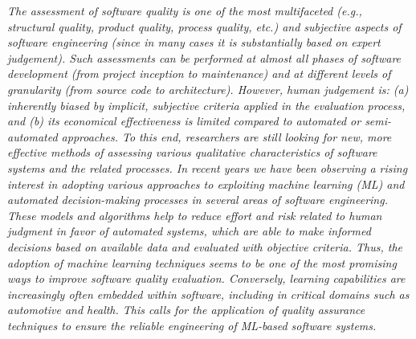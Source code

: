 \begin{myquote}{2em}
    \itshape
    The assessment of software quality is one of the most multifaceted (e.g., structural quality, product quality, process quality, etc.) and subjective aspects of software engineering (since in many cases it is substantially based on expert judgement).
    Such assessments can be performed at almost all phases of software development (from project inception to maintenance) and at different levels of granularity (from source code to architecture). However, human judgement is: (a) inherently biased by implicit, subjective criteria applied in the evaluation process, and (b) its economical effectiveness is limited compared to automated or semi-automated approaches.
    To this end, researchers are still looking for new, more effective methods of assessing various qualitative characteristics of software systems and the related processes.
    In recent years we have been observing a rising interest in adopting various approaches to exploiting machine learning (ML) and automated decision-making processes in several areas of software engineering. These models and algorithms help to reduce effort and risk related to human judgment in favor of automated systems, which are able to make informed decisions based on available data and evaluated with objective criteria.
    Thus, the adoption of machine learning techniques seems to be one of the most promising ways to improve software quality evaluation.
    Conversely, learning capabilities are increasingly often embedded within software, including in critical domains such as automotive and health.
    This calls for the application of quality assurance techniques to ensure the reliable engineering of ML-based software systems.
\end{myquote}

